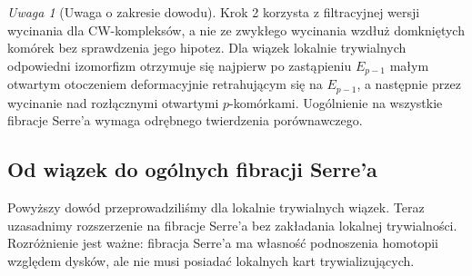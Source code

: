\documentclass[11pt,a4paper,oneside]{report}
\theoremstyle{plain}
\theoremstyle{definition}
\theoremstyle{remark}
\newtheorem{uwaga}[twierdzenie]{Uwaga}
\begin{document}
\begin{uwaga}[Uwaga o zakresie dowodu]
Krok 2 korzysta z filtracyjnej wersji wycinania dla
CW-kompleksów, a nie ze zwykłego wycinania wzdłuż
domkniętych komórek bez sprawdzenia jego hipotez.
Dla wiązek lokalnie trywialnych odpowiedni izomorfizm
otrzymuje się najpierw po zastąpieniu $E_{p-1}$ małym
otwartym otoczeniem deformacyjnie retrahującym się
na $E_{p-1}$, a następnie przez wycinanie nad rozłącznymi
otwartymi $p$-komórkami. Uogólnienie na wszystkie fibracje
Serre'a wymaga odrębnego twierdzenia porównawczego.
\end{uwaga}

\subsection*{Od wiązek do ogólnych fibracji Serre'a}
Powyższy dowód przeprowadziliśmy dla lokalnie trywialnych wiązek.
Teraz uzasadnimy rozszerzenie na fibracje Serre'a bez zakładania
lokalnej trywialności. Rozróżnienie jest ważne: fibracja Serre'a
ma własność podnoszenia homotopii względem dysków, ale nie
musi posiadać lokalnych kart trywializujących.
\end{document}
